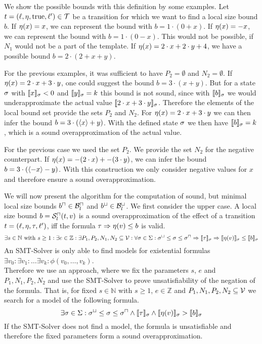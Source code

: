 We show the possible bounds with this definition by some examples.
Let $t = (\ell,\eta,\text{true},\ell') \in \mathcal{T}$ be a transition for which we want to find a local size bound $b$.
If $\eta(x) = x$, we can represent the bound with $b = 1 \cdot (0 + x)$.
If $\eta(x) = -x$, we can represent the bound with $b = 1 \cdot (0 - x)$.
This would not be possible, if $N_1$ would not be a part of the template.
If $\eta(x) = 2 \cdot x + 2 \cdot y + 4$, we have a possible bound $b = 2 \cdot (2 + x + y)$.

For the previous examples, it was sufficient to have $P_2 = \emptyset$ and $N_2 = \emptyset$.
If $\eta(x) = 2 \cdot x + 3 \cdot y$, one could suggest the bound $b = 3 \cdot (x + y)$.
But for a state $\sigma$ with $\llbracket x \rrbracket_{\sigma} < 0$ and $\llbracket y \rrbracket_{\sigma} = k$ this bound is not sound, since with $\llbracket b \rrbracket_{\sigma}$ we would underapproximate the actual value $\llbracket 2 \cdot x + 3 \cdot y \rrbracket_{\sigma}$.
Therefore the elements of the local bound set provide the sets $P_2$ and $N_2$.
For $\eta(x) = 2 \cdot x + 3 \cdot y$ we can then infer the bound $b = 3 \cdot (\langle x\rangle + y)$.
With the defined state $\sigma$ we then have $\llbracket b \rrbracket_{\sigma} = k$, which is a sound overapproximation of the actual value. 

For the previous case we used the set $P_2$.
We provide the set $N_2$ for the negative counterpart.
If $\eta(x) = -(2 \cdot x) + -(3 \cdot y)$, we can infer the bound $b = 3 \cdot (\langle-x\rangle - y)$.
With this construction we only consider negative values for $x$ and therefore ensure a sound overapproximation.

We will now present the algorithm for the computation of sound, but minimal local size bounds $b^\sqcap \in \mathcal{B}^\sqcap_l$ and $b^\sqcup \in \mathcal{B}^\sqcup_l$.
We first consider the upper case.
A local size bound $b = {\mathcal{S}^\sqcap_l}(t,v)$ is a sound overapproximation of the effect of a transition $t = (\ell,\eta,\tau,\ell')$, iff the formula $\tau \Rightarrow \eta(v) \leq b$ is valid.
\[ \exists s \in \mathbb{N} \text{ with } s \geq 1:
\exists e \in \mathbb{Z}:
\exists P_1, P_2, N_1, N_2 \subseteq \mathcal{V}:
\forall \sigma \in \Sigma:
{\sigma^\sqcup} \leq \sigma \leq {\sigma^\sqcap} \Rightarrow
\llbracket \tau \rrbracket_{\sigma} \Rightarrow \llbracket \eta(v) \rrbracket_{\sigma} \leq \llbracket b \rrbracket_{\sigma} \]
An SMT-Solver is only able to find models for existential formulas $\exists v_0: \exists v_1: \dots \exists v_k: \phi(v_0, \dots, v_k)$. \cite{smt} \\
Therefore we use an approach, where we fix the parameters $s$, $e$ and $P_1, N_1, P_2, N_2$ and use the SMT-Solver to prove unsatisfiability of the negation of the formula.
That is, for fixed $s \in \mathbb{N}$ with $s \geq 1$, $e \in \mathbb{Z}$ and $P_1, N_1, P_2, N_2 \subseteq \mathcal{V}$ we search for a model of the following formula.
\[ \exists \sigma \in \Sigma: {\sigma^\sqcup} \leq \sigma \leq {\sigma^\sqcap} \wedge \llbracket \tau \rrbracket_{\sigma} \wedge \llbracket \eta(v) \rrbracket_{\sigma} > \llbracket b \rrbracket_{\sigma} \]
If the SMT-Solver does not find a model, the formula is unsatisfiable and therefore the fixed parameters form a sound overapproximation.

